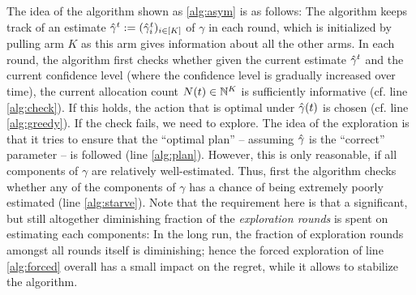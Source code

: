 The idea of the algorithm shown as \cref{alg:asym} is as follows:
The algorithm keeps track of an estimate $\hat{\gamma}^{t}:=(\hat{\gamma}^t_i)_{i \in [K]}$ of $\gamma$ in each round, which is initialized by pulling arm $K$ as this arm
gives information about all the other arms.
In each round, the algorithm first checks whether given the current estimate $\hat{\gamma}^t$ and the current confidence level (where the confidence level is gradually increased over time), the current allocation count $N(t)\in \mathbb{N}^K$
is sufficiently informative (cf. line \ref{alg:check}). If this holds, the action that is optimal under $\hat{\gamma}(t)$ is chosen 
(cf. line \ref{alg:greedy}). If the check fails, we need to explore.
The idea of the exploration is that it tries to ensure that the ``optimal plan'' -- assuming $\hat{\gamma}$ is the ``correct'' parameter -- is followed (line \ref{alg:plan}). However, this is only reasonable, if all components of $\gamma$ are relatively well-estimated.
Thus, first the algorithm checks whether any of the components of $\gamma$ has a chance of being
extremely poorly estimated (line \ref{alg:starve}). Note that the requirement here is that a significant, but still altogether diminishing fraction of the \emph{exploration rounds} is spent on estimating each components: In the long run, the fraction of exploration rounds amongst all rounds itself is diminishing; hence the forced exploration of line \ref{alg:forced} overall has a small impact on the regret, while it allows to stabilize the algorithm.

